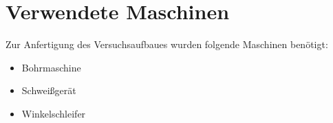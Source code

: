 \section{Verwendete Maschinen}

Zur Anfertigung des Versuchsaufbaues wurden folgende Maschinen benötigt:

\begin{itemize}
    \item Bohrmaschine
    \item Schweißgerät
    \item Winkelschleifer
\end{itemize}